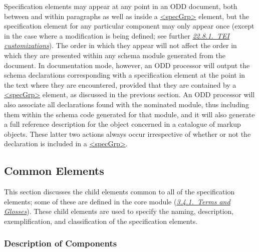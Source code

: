 Specification elements may appear at any point in an ODD document, both between and within paragraphs as well as inside a \hyperref[TEI.specGrp]{<specGrp>} element, but the specification element for any particular component may only appear once (except in the case where a modification is being defined; see further \textit{\hyperref[TDbuild]{22.8.1.\ TEI customizations}}). The order in which they appear will not affect the order in which they are presented within any schema module generated from the document. In documentation mode, however, an ODD processor will output the schema declarations corresponding with a specification element at the point in the text where they are encountered, provided that they are contained by a \hyperref[TEI.specGrp]{<specGrp>} element,  as discussed in the previous section. An ODD processor will also associate all declarations found with the nominated module, thus including them within the schema code generated for that module, and it will also generate a full reference description for the object concerned in a catalogue of markup objects. These latter two actions always occur irrespective of whether or not the declaration is included in a \hyperref[TEI.specGrp]{<specGrp>}.
\subsection[{Common Elements}]{Common Elements}\label{TDcrystalsCE}\par
This section discusses the child elements common to all of the specification elements; some of these are defined in the core module (\textit{\hyperref[COHTG]{3.4.1.\ Terms and Glosses}}). These child elements are used to specify the naming, description, exemplification, and classification of the specification elements.
\subsubsection[{Description of Components}]{Description of Components}\label{TDcrystalsCEdc}\par

